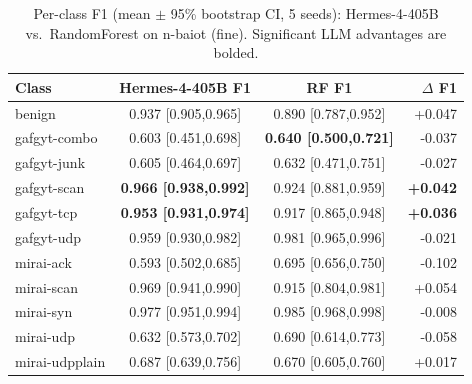 \begin{table}[t]
\caption{Per-class F1 (mean $\pm$ 95\% bootstrap CI, 5 seeds): Hermes-4-405B vs.\ RandomForest on n-baiot (fine). Significant LLM advantages are bolded.}
\label{t:r2_perclass}
\begin{tabular}{lccr}
\hline
Class & Hermes-4-405B F1 & RF F1 & $\Delta$ F1 \\
\hline
benign & 0.937 [0.905,0.965] & 0.890 [0.787,0.952] & +0.047 \\
gafgyt-combo & 0.603 [0.451,0.698] & \textbf{0.640 [0.500,0.721]} & -0.037 \\
gafgyt-junk & 0.605 [0.464,0.697] & 0.632 [0.471,0.751] & -0.027 \\
gafgyt-scan & \textbf{0.966 [0.938,0.992]} & 0.924 [0.881,0.959] & \textbf{+0.042} \\
gafgyt-tcp & \textbf{0.953 [0.931,0.974]} & 0.917 [0.865,0.948] & \textbf{+0.036} \\
gafgyt-udp & 0.959 [0.930,0.982] & 0.981 [0.965,0.996] & -0.021 \\
mirai-ack & 0.593 [0.502,0.685] & 0.695 [0.656,0.750] & -0.102 \\
mirai-scan & 0.969 [0.941,0.990] & 0.915 [0.804,0.981] & +0.054 \\
mirai-syn & 0.977 [0.951,0.994] & 0.985 [0.968,0.998] & -0.008 \\
mirai-udp & 0.632 [0.573,0.702] & 0.690 [0.614,0.773] & -0.058 \\
mirai-udpplain & 0.687 [0.639,0.756] & 0.670 [0.605,0.760] & +0.017 \\
\hline
\end{tabular}
\end{table}